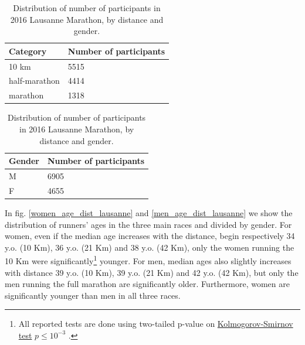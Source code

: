 \documentclass[fleqn,10pt]{wlscirep}
\begin{document}

	 	\begin{table}
	 		\centering
	 		\begin{tabular}[t]{l|l}
	 			Category     & Number of participants \\ \hline
	 			10 km         & 5515                   \\
	 			half-marathon & 4414                   \\
	 			marathon      & 1318                   \\
	 		\end{tabular}
 			\hfill
 			\begin{tabular}[t]{l|l}
				Gender     		& Number of participants \\ \hline
 				M       	  & 6905 					\\
				F		 		& 4655                   \\
 			\end{tabular}
 		\caption{Distribution of number of participants in 2016 Lausanne Marathon, by distance and gender.}
 		\label{counts_per_distance}
	 	\end{table}
 	
 		In fig. \ref{women_age_dist_lausanne} and \ref{men_age_dist_lausanne} we show the distribution of runners' ages in the three main races and divided by gender.
 		For women, even if the median age increases with the distance, begin respectively 
 		34 y.o. (10 Km),
 		36 y.o. (21 Km) and
 		38 y.o. (42 Km),
 		only the women running the 10 Km were 
 		significantly\footnote{All reported tests are done using two-tailed p-value on \href{https://en.wikipedia.org/wiki/Kolmogorov–Smirnov\_test\#Two-sample\_Kolmogorov.E2.80.93Smirnov_test}{Kolmogorov-Smirnov test} $ p \leq 10^{-3} $ .} 
 		younger.
 		For men, median ages also slightly increases with distance
 		39 y.o. (10 Km),
 		39 y.o. (21 Km) and
 		42 y.o. (42 Km),
 		but only the men running the full marathon are significantly older.
 		Furthermore, women are significantly younger than men in all three races.
 		
\end{document}
